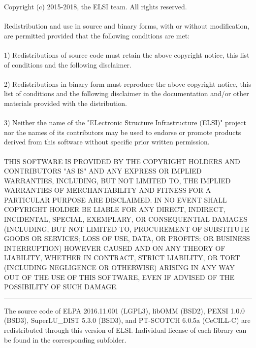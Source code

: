 \documentclass{report}
\begin{document}
Copyright (c) 2015-2018, the ELSI team.  All rights reserved.\\
\\
Redistribution and use in source and binary forms, with or without modification, are permitted provided that the following conditions are met:\\
\\
1) Redistributions of source code must retain the above copyright notice, this list of conditions and the following disclaimer.\\
\\
2) Redistributions in binary form must reproduce the above copyright notice, this list of conditions and the following disclaimer in the documentation and/or other materials provided with the distribution.\\
\\
3) Neither the name of the "ELectronic Structure Infrastructure (ELSI)" project nor the names of its contributors may be used to endorse or promote products derived from this software without specific prior written permission.\\
\\
THIS SOFTWARE IS PROVIDED BY THE COPYRIGHT HOLDERS AND CONTRIBUTORS "AS IS" AND ANY EXPRESS OR IMPLIED WARRANTIES, INCLUDING, BUT NOT LIMITED TO, THE IMPLIED WARRANTIES OF MERCHANTABILITY AND FITNESS FOR A PARTICULAR PURPOSE ARE DISCLAIMED.  IN NO EVENT SHALL COPYRIGHT HOLDER BE LIABLE FOR ANY DIRECT, INDIRECT, INCIDENTAL, SPECIAL, EXEMPLARY, OR CONSEQUENTIAL DAMAGES (INCLUDING, BUT NOT LIMITED TO, PROCUREMENT OF SUBSTITUTE GOODS OR SERVICES; LOSS OF USE, DATA, OR PROFITS; OR BUSINESS INTERRUPTION) HOWEVER CAUSED AND ON ANY THEORY OF LIABILITY, WHETHER IN CONTRACT, STRICT LIABILITY, OR TORT (INCLUDING NEGLIGENCE OR OTHERWISE) ARISING IN ANY WAY OUT OF THE USE OF THIS SOFTWARE, EVEN IF ADVISED OF THE POSSIBILITY OF SUCH DAMAGE.\\
\bigskip
\bigskip
\noindent\rule{18cm}{0.4pt}

The source code of ELPA 2016.11.001 (LGPL3), libOMM (BSD2), PEXSI 1.0.0 (BSD3), SuperLU\_DIST 5.3.0 (BSD3), and PT-SCOTCH 6.0.5a (CeCILL-C) are redistributed through this version of ELSI.  Individual license of each library can be found in the corresponding subfolder.\\
\end{document}
